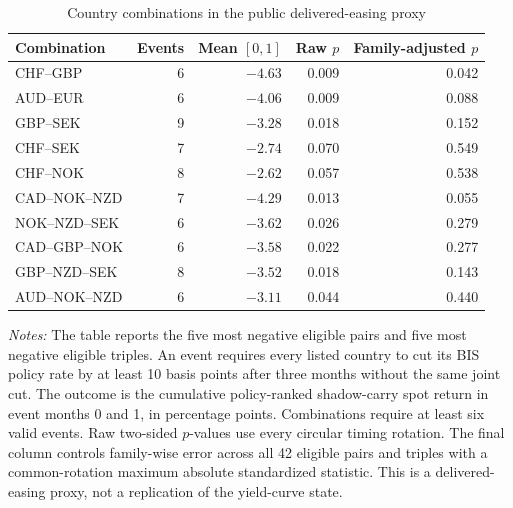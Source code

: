\begin{table}[H]
\centering
\caption{Country combinations in the public delivered-easing proxy}
\label{tab:public-country-combinations}
\small
\begin{tabular}{lrrrr}
\toprule
Combination & Events & Mean $[0,1]$ & Raw $p$ & Family-adjusted $p$ \\
\midrule
CHF--GBP & 6 & $-4.63$ & 0.009 & 0.042 \\
AUD--EUR & 6 & $-4.06$ & 0.009 & 0.088 \\
GBP--SEK & 9 & $-3.28$ & 0.018 & 0.152 \\
CHF--SEK & 7 & $-2.74$ & 0.070 & 0.549 \\
CHF--NOK & 8 & $-2.62$ & 0.057 & 0.538 \\
CAD--NOK--NZD & 7 & $-4.29$ & 0.013 & 0.055 \\
NOK--NZD--SEK & 6 & $-3.62$ & 0.026 & 0.279 \\
CAD--GBP--NOK & 6 & $-3.58$ & 0.022 & 0.277 \\
GBP--NZD--SEK & 8 & $-3.52$ & 0.018 & 0.143 \\
AUD--NOK--NZD & 6 & $-3.11$ & 0.044 & 0.440 \\
\bottomrule
\end{tabular}

\begin{minipage}{0.94\textwidth}
\footnotesize\emph{Notes:} The table reports the five most negative eligible pairs and five most negative eligible triples. An event requires every listed country to cut its BIS policy rate by at least 10 basis points after three months without the same joint cut. The outcome is the cumulative policy-ranked shadow-carry spot return in event months 0 and 1, in percentage points. Combinations require at least six valid events. Raw two-sided $p$-values use every circular timing rotation. The final column controls family-wise error across all 42 eligible pairs and triples with a common-rotation maximum absolute standardized statistic. This is a delivered-easing proxy, not a replication of the yield-curve state.
\end{minipage}
\end{table}
